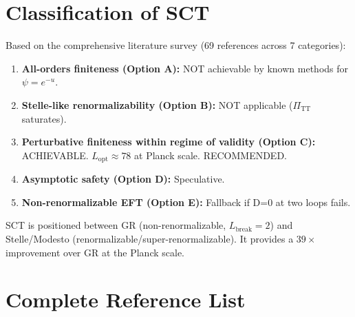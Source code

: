 \documentclass[12pt,a4paper]{article}
\begin{document}
\section{Classification of SCT}
\label{sec:classification}

Based on the comprehensive literature survey (69 references across 7 categories):

\begin{enumerate}
  \item \textbf{All-orders finiteness (Option A):} NOT achievable by known
    methods for $\psi = e^{-u}$.
  \item \textbf{Stelle-like renormalizability (Option B):} NOT applicable
    ($\Pi_{\mathrm{TT}}$ saturates).
  \item \textbf{Perturbative finiteness within regime of validity (Option C):}
    ACHIEVABLE. $L_{\mathrm{opt}} \approx 78$ at Planck scale. RECOMMENDED.
  \item \textbf{Asymptotic safety (Option D):} Speculative.
  \item \textbf{Non-renormalizable EFT (Option E):} Fallback if D=0 at two
    loops fails.
\end{enumerate}

SCT is positioned between GR (non-renormalizable, $L_{\mathrm{break}} = 2$)
and Stelle/Modesto (renormalizable/super-renormalizable). It provides
a $39\times$ improvement over GR at the Planck scale.

\section{Complete Reference List}
\label{sec:references}
\end{document}
